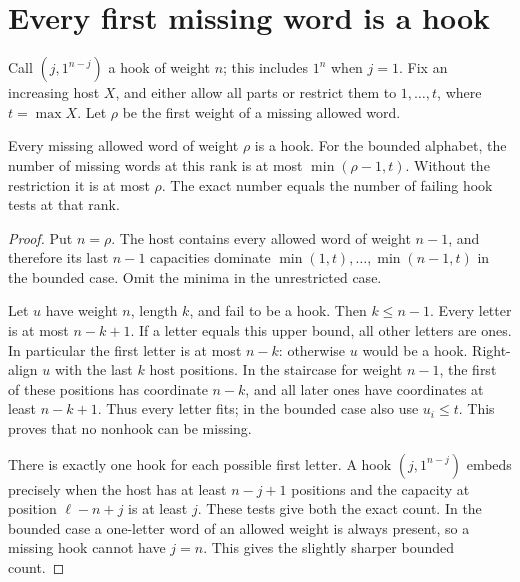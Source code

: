 \section{Every first missing word is a hook}
Call $(j,1^{n-j})$ a hook of weight $n$; this includes $1^n$
when $j=1$. Fix an increasing host $X$, and either allow all
parts or restrict them to $1,\ldots,t$, where $t=\max X$.
Let $\rho$ be the first weight of a missing allowed word.

\begin{theorem}
Every missing allowed word of weight $\rho$ is a hook.
For the bounded alphabet, the number of missing words at this
rank is at most $\min(\rho-1,t)$. Without the restriction it is
at most $\rho$. The exact number equals the number of failing
hook tests at that rank.
\end{theorem}
\begin{proof}
Put $n=\rho$. The host contains every allowed word of weight
$n-1$, and therefore its last $n-1$ capacities dominate
$\min(1,t),\ldots,\min(n-1,t)$ in the bounded case. Omit
the minima in the unrestricted case.

Let $u$ have weight $n$, length $k$, and fail to be a hook.
Then $k\le n-1$. Every letter is at most $n-k+1$.
If a letter equals this upper bound, all other letters are
ones. In particular the first letter is at most $n-k$:
otherwise $u$ would be a hook. Right-align $u$ with the
last $k$ host positions. In the staircase for weight $n-1$,
the first of these positions has coordinate $n-k$, and all
later ones have coordinates at least $n-k+1$. Thus every
letter fits; in the bounded case also use $u_i\le t$.
This proves that no nonhook can be missing.

There is exactly one hook for each possible first letter.
A hook $(j,1^{n-j})$ embeds precisely when the host has at
least $n-j+1$ positions and the capacity at position
$\ell-n+j$ is at least $j$. These tests give both the
exact count. In the bounded case a one-letter word of an
allowed weight is always present, so a missing hook cannot
have $j=n$. This gives the slightly sharper bounded count.
\end{proof}

